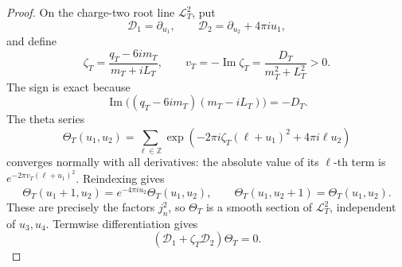 \documentclass[11pt]{article}
\theoremstyle{definition}
\numberwithin{equation}{section}
\begin{document}
\begin{proof}
On the charge-two root line \(\mathscr L_T^2\), put
\[
 \mathcal D_1=\partial_{u_1},
 \qquad
 \mathcal D_2=\partial_{u_2}+4\pi i u_1,
\]
and define
\begin{equation}
 \zeta_T=\frac{q_T-6im_T}{m_T+iL_T},
 \qquad
 v_T=-\operatorname{Im}\zeta_T
 =\frac{D_T}{m_T^2+L_T^2}>0.
 \label{cusp-link-magnetic-theta-parameter}
\end{equation}
The sign is exact because
\[
 \operatorname{Im}\bigl((q_T-6im_T)(m_T-iL_T)\bigr)=-D_T.
\]
The theta series
\begin{equation}
 \Theta_T(u_1,u_2)
 =\sum_{\ell\in\mathbb Z}
 \exp\!\left(-2\pi i\zeta_T(\ell+u_1)^2+4\pi i\ell u_2\right)
 \label{cusp-link-magnetic-theta-series}
\end{equation}
converges normally with all derivatives: the absolute value of its
\(\ell\)-th term is \(e^{-2\pi v_T(\ell+u_1)^2}\).  Reindexing gives
\begin{equation}
 \Theta_T(u_1+1,u_2)=e^{-4\pi iu_2}\Theta_T(u_1,u_2),
 \qquad
 \Theta_T(u_1,u_2+1)=\Theta_T(u_1,u_2).
 \label{cusp-link-magnetic-theta-automorphy}
\end{equation}
These are precisely the factors \(j_n^2\), so \(\Theta_T\) is a smooth
section of \(\mathscr L_T^2\), independent of \(u_3,u_4\).  Termwise
differentiation gives
\begin{equation}
 (\mathcal D_1+\zeta_T\mathcal D_2)\Theta_T=0.
 \label{cusp-link-magnetic-marked-annihilator}
\end{equation}


\end{proof}
\end{document}
